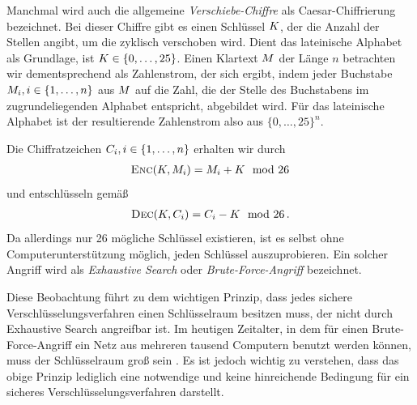 Manchmal wird auch die allgemeine \emph{Verschiebe-Chiffre} als Caesar-Chiffrierung bezeichnet. Bei dieser Chiffre gibt es einen Schlüssel $K$, der die Anzahl der Stellen angibt, um die zyklisch verschoben wird. Dient das lateinische Alphabet als Grundlage, ist $K \in \{0,\dots,25\}$. Einen Klartext $M$ der Länge $n$ betrachten wir dementsprechend als Zahlenstrom, der sich ergibt, indem jeder Buchstabe $M_{i}, i \in \{1,\dots,n\}$ aus $M$ auf die Zahl, die der Stelle des Buchstabens im zugrundeliegenden Alphabet entspricht, abgebildet wird. Für das lateinische Alphabet ist der resultierende Zahlenstrom also aus $\{0,\dots,25\}^{n}$. 

Die Chiffratzeichen $C_{i}, i \in \{1,\dots,n\}$ erhalten wir durch 
\begin{align*}
	\textsc{Enc}(K, M_i) = M_i + K \mod 26
\end{align*}
und entschlüsseln gemäß
\begin{align*}
	\textsc{Dec}(K, C_i) = C_i - K \mod 26\, .
\end{align*}
Da allerdings nur 26 mögliche Schlüssel existieren, ist es selbst ohne Computerunterstützung möglich, jeden Schlüssel auszuprobieren. Ein solcher Angriff wird als \emph{Exhaustive Search} oder \emph{Brute-Force-Angriff} \indexBruteForce bezeichnet.


Diese Beobachtung führt zu dem wichtigen Prinzip, dass jedes sichere Verschlüsselungsverfahren einen Schlüsselraum besitzen muss, der nicht durch Exhaustive Search angreifbar ist. Im heutigen Zeitalter, in dem für einen Brute-Force-Angriff \indexBruteForce ein Netz aus mehreren tausend Computern benutzt werden können, muss der Schlüsselraum groß sein \cite{NIST_800_57, Blaze1996}. Es ist jedoch wichtig zu verstehen, dass das obige Prinzip lediglich eine notwendige und keine hinreichende Bedingung für ein sicheres Verschlüsselungsverfahren darstellt.

